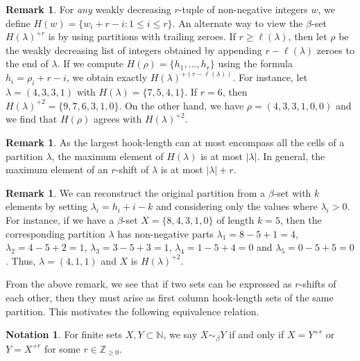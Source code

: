 \documentclass[12pt]{amsart}
\theoremstyle{definition}
\newtheorem{notation}[theorem]{Notation}
\newtheorem{remark}[theorem]{Remark}
\numberwithin{equation}{section}
\newcommand{\la}{\lambda}
\begin{document}
\begin{remark}
    For \textit{any} weakly decreasing $r$-tuple of non-negative integers $w$, we define $H(w) = \{w_i + r - i : 1\leq i\leq r\}$.
    An alternate way to view the $\beta$-set $H(\lambda)^{+r}$ is by using partitions with trailing zeroes. If $r\geq \ell(\lambda)$, then let $\rho$ be the weakly decreasing list of integers obtained by appending $r-\ell(\lambda)$ zeroes to the end of $\la$. If we compute $H(\rho) = \{h_1, \ldots, h_r\}$ using the formula $h_i = \rho_i + r - i$, we obtain exactly $H(\lambda)^{+(r-\ell(\la))}$. For instance, let $\la = (4,3,3,1)$ with $H(\la) = \{7,5,4,1\}$. If $r = 6$, then $H(\lambda)^{+2} = \{9,7,6,3,1,0\}$. On the other hand, we have $\rho = (4,3,3,1,0,0)$ and we find that $H(\rho)$ agrees with $H(\la)^{+2}$.
\end{remark}

\begin{remark}\label{max-of-H-lambda}
    As the largest hook-length can at most encompass all the cells of a partition $\la$, the maximum element of $H(\lambda)$ is at most $|\lambda|$. In general, the maximum element of an $r$-shift of $\la$ is at most $|\la| + r$.
\end{remark}
\begin{remark}\label{rem:partition-from-beta-set}
     We can reconstruct the original partition from a $\beta$-set with $k$ elements by setting $\lambda_i = h_i + i - k$ and considering only the values where $\lambda_i >0$. For instance, if we have a $\beta$-set $X = \{8,4,3,1,0\}$ of length $k= 5$, then the corresponding partition $\la$ has non-negative parts $\la_1 = 8 - 5 + 1 = 4$, $\la_2 = 4 - 5 + 2 = 1$, $\la_3 = 3 - 5 + 3 = 1$, $\la_4 = 1 -5 + 4 =0$ and $\la_5 = 0 -5 + 5 = 0$. Thus, $\la = (4,1,1)$ and $X$ is $H(\la)^{+2}$. 
\end{remark}
From the above remark, we see that if two sets can be expressed as $r$-shifts of each other, then they must arise as first column hook-length sets of the same partition. This motivates the following equivalence relation.
\begin{notation}\label{notn:sim}
    For finite sets $X, Y\subset \mathbb{N}$, we say $X\sim_{\beta} Y$ if and only if $X = Y^{+r}$ or $Y = X^{+r}$ for some $r \in \mathbb{Z}_{\geq 0}$. 
\end{notation}
\end{document}
